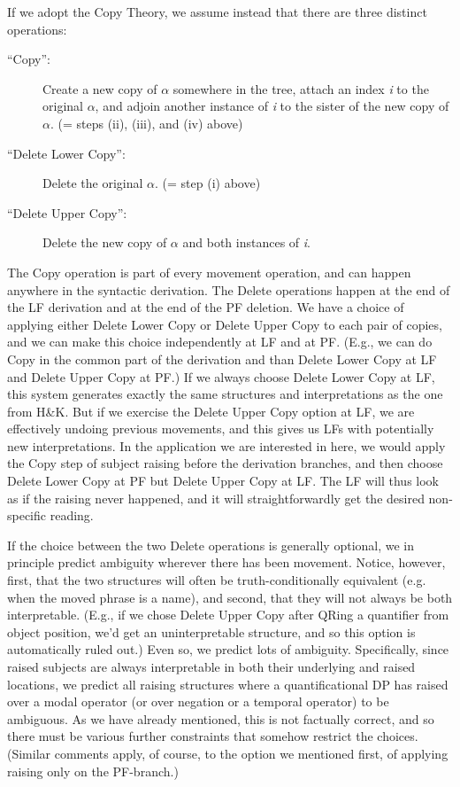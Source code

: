 If we adopt the Copy Theory, we assume instead that there are three distinct
operations:

\begin{description}
	
\item[``Copy'':] Create a new copy of $\alpha$ somewhere in the tree, attach an
  index \emph{i} to the original $\alpha$, and adjoin another instance of
  \emph{i} to the sister of the new copy of $\alpha$. (= steps (ii), (iii), and
  (iv) above)
	
\item[``Delete Lower Copy'':] Delete the original $\alpha$. (= step (i) above)
	
\item[``Delete Upper Copy'':] Delete the new copy of $\alpha$ and both instances
  of \emph{i}.
\end{description}
%
The Copy operation is part of every movement operation, and can happen anywhere
in the syntactic derivation. The Delete operations happen at the end of the LF
derivation and at the end of the PF deletion. We have a choice of applying
either Delete Lower Copy or Delete Upper Copy to each pair of copies, and we can
make this choice independently at LF and at PF. (E.g., we can do Copy in the
common part of the derivation and than Delete Lower Copy at LF and Delete Upper
Copy at PF.) If we always choose Delete Lower Copy at LF, this system generates
exactly the same structures and interpretations as the one from H\&K. But if we
exercise the Delete Upper Copy option at LF, we are effectively undoing previous
movements, and this gives us LFs with potentially new interpretations. In the
application we are interested in here, we would apply the Copy step of subject
raising before the derivation branches, and then choose Delete Lower Copy at PF
but Delete Upper Copy at LF. The LF will thus look as if the raising never
happened, and it will straightforwardly get the desired non-specific reading.

If the choice between the two Delete operations is generally optional, we in
principle predict ambiguity wherever there has been movement. Notice, however,
first, that the two structures will often be truth-conditionally equivalent
(e.g. when the moved phrase is a name), and second, that they will not always be
both interpretable. (E.g., if we chose Delete Upper Copy after QRing a
quantifier from object position, we'd get an uninterpretable structure, and so
this option is automatically ruled out.) Even so, we predict lots of ambiguity.
Specifically, since raised subjects are always interpretable in both their
underlying and raised locations, we predict all raising structures where a
quantificational DP has raised over a modal operator (or over negation or a
temporal operator) to be ambiguous. As we have already mentioned, this is not
factually correct, and so there must be various further constraints that somehow
restrict the choices. (Similar comments apply, of course, to the option we
mentioned first, of applying raising only on the PF-branch.)

